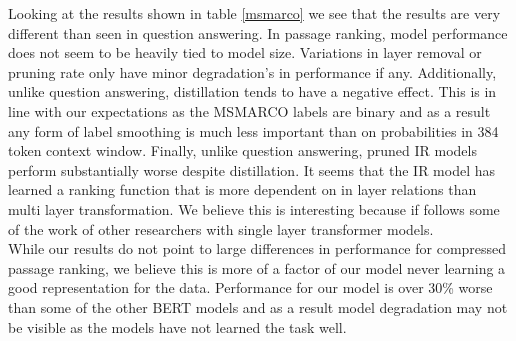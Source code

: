 Looking at the results shown in table \ref{msmarco} we see that the results are very different than seen in question answering. In passage ranking, model performance does not seem to be heavily tied to model size. Variations in layer removal or pruning rate only have minor degradation's in performance if any. Additionally, unlike question answering, distillation tends to have a negative effect. This is in line with our expectations as the MSMARCO labels are binary and as a result any form of label smoothing is much less important than on probabilities in 384 token context window. Finally, unlike question answering, pruned IR models perform substantially worse despite distillation. It seems that the IR model has learned a ranking function that is more dependent on in layer relations than multi layer transformation. We believe this is interesting because if follows some of the work of other researchers with single layer transformer models. \\
While our results do not point to large differences in performance for compressed passage ranking, we believe this is more of a factor of our model never learning a good representation for the data. Performance for our model is over 30\% worse than some of the other BERT models and as a result model degradation may not be visible as the models have not learned the task well. 
